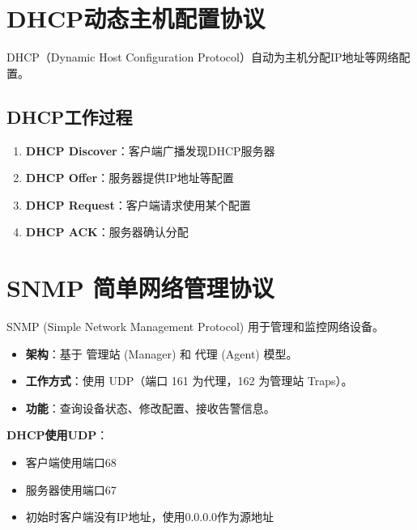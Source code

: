 \section{DHCP动态主机配置协议}
DHCP（Dynamic Host Configuration Protocol）自动为主机分配IP地址等网络配置。

\subsection{DHCP工作过程}
\begin{enumerate}[leftmargin=2em,itemsep=0pt]
    \item \textbf{DHCP Discover}：客户端广播发现DHCP服务器
    \item \textbf{DHCP Offer}：服务器提供IP地址等配置
    \item \textbf{DHCP Request}：客户端请求使用某个配置
    \item \textbf{DHCP ACK}：服务器确认分配
\end{enumerate}

\section{SNMP 简单网络管理协议}
SNMP (Simple Network Management Protocol) 用于管理和监控网络设备。
\begin{itemize}[leftmargin=2em,itemsep=0pt]
    \item \textbf{架构}：基于 管理站 (Manager) 和 代理 (Agent) 模型。
    \item \textbf{工作方式}：使用 UDP（端口 161 为代理，162 为管理站 Traps）。
    \item \textbf{功能}：查询设备状态、修改配置、接收告警信息。
\end{itemize}

\begin{notebox}
\textbf{DHCP使用UDP}：
\begin{itemize}[itemsep=0pt]
    \item 客户端使用端口68
    \item 服务器使用端口67
    \item 初始时客户端没有IP地址，使用0.0.0.0作为源地址
\end{itemize}
\end{notebox}

